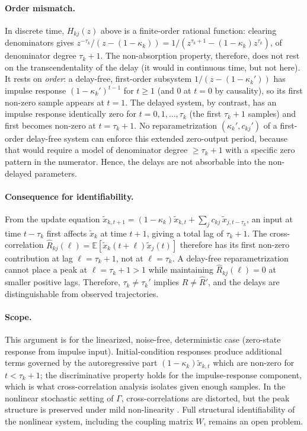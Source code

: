 \documentclass{article}
\begin{document}
\paragraph{Order mismatch.} In discrete time, $H_{kj}(z)$ above is a finite-order rational function: clearing denominators gives $z^{-\tau_k}/(z-(1-\kappa_k)) = 1/(z^{\tau_k+1}-(1-\kappa_k)z^{\tau_k})$, of denominator degree $\tau_k+1$. The non-absorption property, therefore, does not rest on the transcendentality of the delay (it would in continuous time, but not here). It rests on \emph{order}: a delay-free, first-order subsystem $1/(z-(1-\kappa_k'))$ has impulse response $(1-\kappa_k')^{t-1}$ for $t \geq 1$ (and $0$ at $t=0$ by causality), so its first non-zero sample appears at $t=1$. The delayed system, by contrast, has an impulse response identically zero for $t = 0, 1, \ldots, \tau_k$ (the first $\tau_k+1$ samples) and first becomes non-zero at $t=\tau_k+1$. No reparametrization $(\kappa_k', c_{kj}')$ of a first-order delay-free system can enforce this extended zero-output period, because that would require a model of denominator degree $\geq \tau_k+1$ with a specific zero pattern in the numerator. Hence, the delays are not absorbable into the non-delayed parameters.

\paragraph{Consequence for identifiability.} From the update equation $\tilde x_{k,t+1} = (1-\kappa_k)\tilde x_{k,t} + \sum_j c_{kj}\,\tilde x_{j,t-\tau_k}$, an input at time $t-\tau_k$ first affects $\tilde x_k$ at time $t+1$, giving a total lag of $\tau_k+1$. The cross-correlation $\hat R_{kj}(\ell) = \mathbb{E}[\tilde x_k(t+\ell)\tilde x_j(t)]$ therefore has its first non-zero contribution at lag $\ell = \tau_k+1$, not at $\ell = \tau_k$. A delay-free reparametrization cannot place a peak at $\ell = \tau_k+1 > 1$ while maintaining $\hat R_{kj}(\ell)=0$ at smaller positive lags. Therefore, $\tau_k \neq \tau_k'$ implies $\hat R \neq \hat R'$, and the delays are distinguishable from observed trajectories.

\paragraph{Scope.} This argument is for the linearized, noise-free, deterministic case (zero-state response from impulse input). Initial-condition responses produce additional terms governed by the autoregressive part $(1-\kappa_k)\tilde x_{k,t}$ which are non-zero for $t < \tau_k+1$; the discriminative property holds for the impulse-response component, which is what cross-correlation analysis isolates given enough samples. In the nonlinear stochastic setting of $\Gamma$, cross-correlations are distorted, but the peak structure is preserved under mild non-linearity \citep{oppenheim1999discrete}. Full structural identifiability of the nonlinear system, including the coupling matrix $W$, remains an open problem.
\end{document}
